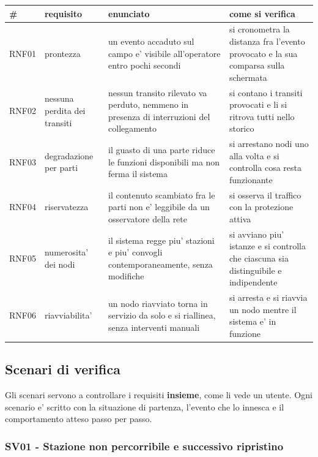 \documentclass[11pt]{article}
\begin{document}
\begin{center}
\begin{tabular}{|p{}|p{}|p{}|p{}|}
\# & requisito & enunciato & come si verifica\\
\hline
RNF01 & prontezza & un evento accaduto sul campo e' visibile all'operatore entro pochi secondi & si cronometra la distanza fra l'evento provocato e la sua comparsa sulla schermata\\
RNF02 & nessuna perdita dei transiti & nessun transito rilevato va perduto, nemmeno in presenza di interruzioni del collegamento & si contano i transiti provocati e li si ritrova tutti nello storico\\
RNF03 & degradazione per parti & il guasto di una parte riduce le funzioni disponibili ma non ferma il sistema & si arrestano nodi uno alla volta e si controlla cosa resta funzionante\\
RNF04 & riservatezza & il contenuto scambiato fra le parti non e' leggibile da un osservatore della rete & si osserva il traffico con la protezione attiva\\
RNF05 & numerosita' dei nodi & il sistema regge piu' stazioni e piu' convogli contemporaneamente, senza modifiche & si avviano piu' istanze e si controlla che ciascuna sia distinguibile e indipendente\\
RNF06 & riavviabilita' & un nodo riavviato torna in servizio da solo e si riallinea, senza interventi manuali & si arresta e si riavvia un nodo mentre il sistema e' in funzione\\
\end{tabular}
\end{center}
\subsection{Scenari di verifica}
\label{sec:org1d3f8e3}

Gli scenari servono a controllare i requisiti \textbf{insieme}, come li vede un utente. Ogni scenario e'
scritto con la situazione di partenza, l'evento che lo innesca e il comportamento atteso passo per
passo.
\subsubsection{SV01 - Stazione non percorribile e successivo ripristino}
\label{sec:org25beac9}
\end{document}
